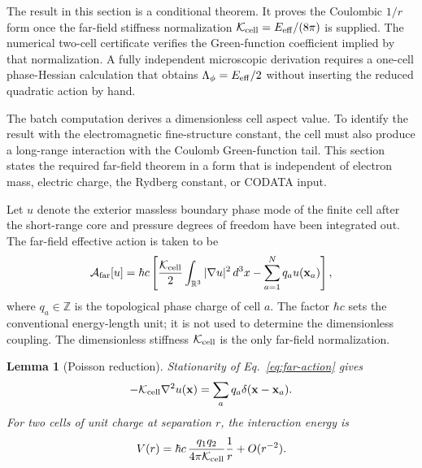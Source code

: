 \documentclass[11pt]{article}
\newcommand{\Kcell}{\mathcal K_{\rm cell}}
\newcommand{\Afar}{\mathcal A_{\rm far}}
\newtheorem{lemma}{Lemma}
\begin{document}
\label{sec:farfield-theorem}

The result in this section is a conditional theorem.  It proves the Coulombic
\(1/r\) form once the far-field stiffness normalization
\(\mathcal K_{\rm cell}=E_{\rm eff}/(8\pi)\) is supplied.  The numerical
two-cell certificate verifies the Green-function coefficient implied by that
normalization.  A fully independent microscopic derivation requires a one-cell
phase-Hessian calculation that obtains \(\Lambda_\phi=E_{\rm eff}/2\) without
inserting the reduced quadratic action by hand.

\label{sec:farfield}

The batch computation derives a dimensionless cell aspect value. To identify the result with the electromagnetic fine-structure constant, the cell must also produce a long-range interaction with the Coulomb Green-function tail. This section states the required far-field theorem in a form that is independent of electron mass, electric charge, the Rydberg constant, or CODATA input.

Let \(u\) denote the exterior massless boundary phase mode of the finite cell after the short-range core and pressure degrees of freedom have been integrated out. The far-field effective action is taken to be
\begin{equation}
\Afar[u]
=
\hbar c\left[
\frac{\Kcell}{2}
\int_{\mathbb R^3} |\nabla u|^2\,d^3x
-
\sum_{a=1}^{N} q_a u(\mathbf x_a)
\right],
\label{eq:far-action}
\end{equation}
where \(q_a\in\mathbb Z\) is the topological phase charge of cell \(a\). The factor \(\hbar c\) sets the conventional energy-length unit; it is not used to determine the dimensionless coupling. The dimensionless stiffness \(\Kcell\) is the only far-field normalization.

\begin{lemma}[Poisson reduction]
Stationarity of Eq.~\eqref{eq:far-action} gives
\begin{equation}
-\Kcell \nabla^2 u(\mathbf x)=\sum_a q_a\delta(\mathbf x-\mathbf x_a).
\label{eq:poisson}
\end{equation}
For two cells of unit charge at separation \(r\), the interaction energy is
\begin{equation}
V(r)=\hbar c\,\frac{q_1q_2}{4\pi\Kcell}\frac{1}{r}+O(r^{-2}).
\label{eq:green-interaction}
\end{equation}
\end{lemma}
\end{document}
